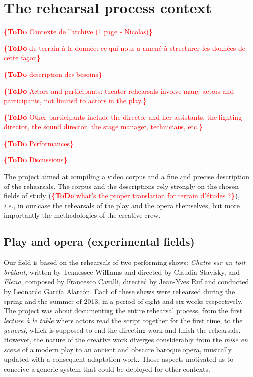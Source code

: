 \documentclass[conference]{IEEEtran}
\newcommand{\todo}[1]{\noindent\textcolor{red}{{\bf \{ToDo} #1{\bf \}}}}
\begin{document}
\section{The rehearsal process context}

\todo{Contexte de l'archive (1 page - Nicolas)}

\todo{du terrain à la donnée: ce qui nous a amené à structurer les données de cette façon}

\todo{description des besoins}

\todo{Actors and participants:  theater rehearsals involve many actors and participants, not limited to actors in the play.}

\todo{Other participants include the director and her assistants, the lighting director, the sound director,
the stage manager, technicians, etc.}

\todo{Performances}

\todo{Discussions}

The project aimed at compiling a video corpus and a fine and precise description of the rehearsals. The corpus and the descriptions rely strongly on the chosen fields of study (\todo{what's the proper translation for terrain d'études ?}), \emph{i.e.}, in our case the rehearsals of the play and the opera themselves, but more importantly the methodologies of the creative crew.

\subsection{Play and opera (experimental fields)}

Our field is based on the rehearsals of two performing shows: \emph{Chatte sur un toit brûlant}, written by Tennessee Williams and directed by Claudia Stavisky, and \emph{Elena}, composed by Francesco Cavalli, directed by Jean-Yves Ruf and conducted by Leonardo García Alarcón.
Each of these shows were rehearsed during the spring and the summer of 2013, in a period of eight and six weeks respectively. The project was about documenting the entire rehearsal process, from the first \emph{lecture à la table} where actors read the script together for the first time, to the \emph{general}, which is supposed to end the directing work and finish the rehearsals.
However, the nature of the creative work diverges considerably from the \emph{mise en scene} of a modern play to an ancient and obscure baroque opera, musically updated with a consequent adaptation work.
Those aspects motivated us to conceive a generic system that could be deployed for other contexts.
\end{document}

